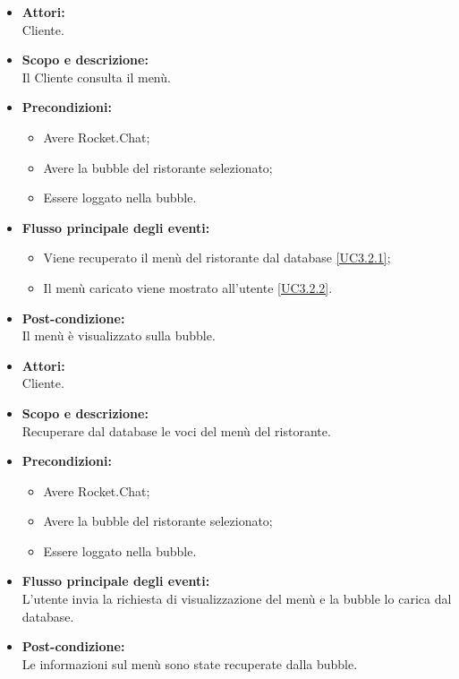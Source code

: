 \begin{itemize}
	\item \textbf{Attori:}
	\\Cliente.
	\item \textbf{Scopo e descrizione:} 
	\\Il Cliente consulta il menù.
	\item \textbf{Precondizioni:}
	\begin{itemize}
		\item Avere Rocket.Chat;
		\item Avere la bubble del ristorante selezionato;
		\item Essere loggato nella bubble.
	\end{itemize}
	\item \textbf{Flusso principale degli eventi:}
	\begin{itemize}
		\item Viene recuperato il menù del ristorante dal database \ref{UC3.2.1};
		\item Il menù caricato viene mostrato all'utente \ref{UC3.2.2}.
	\end{itemize}
	\item \textbf{Post-condizione:}
	\\Il menù è visualizzato sulla bubble.
\end{itemize}


\begin{itemize}
	\item \textbf{Attori:}
	\\Cliente.
	\item \textbf{Scopo e descrizione:} 
	\\Recuperare dal database le voci del menù del ristorante.
	\item \textbf{Precondizioni:}
	\begin{itemize}
		\item Avere Rocket.Chat;
		\item Avere la bubble del ristorante selezionato;
		\item Essere loggato nella bubble.
	\end{itemize}
	\item \textbf{Flusso principale degli eventi:}
	\\L'utente invia la richiesta di visualizzazione del menù e la bubble lo carica dal database.
	\item \textbf{Post-condizione:}
	\\Le informazioni sul menù sono state recuperate dalla bubble.
\end{itemize}

